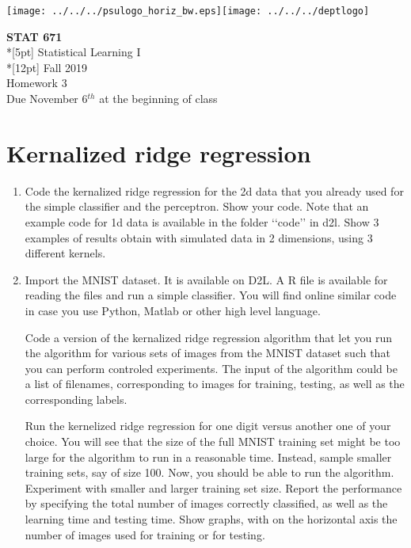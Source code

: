 \documentclass[11pt]{article}
\begin{document}
\thispagestyle{empty}
\texttt{[image: ../../../psulogo\_horiz\_bw.eps]}\hfill\texttt{[image: ../../../deptlogo]}
\vspace{10pt}
\begin{center}
{\large\bf STAT 671}    \\*[5pt] {\Large Statistical Learning I}
\\*[12pt] {\large Fall 2019}
\\ {\large Homework 3}
\\ {\large Due November 6$^{th}$ at the beginning of class}
\end{center}
\vspace{1cm}
\noindent
\section{Kernalized ridge regression}
\begin{enumerate}
\item Code the kernalized ridge regression for the 2d data that you already used for the simple classifier and the perceptron. Show your code. Note that an example code for 1d data is available in the folder \lq\lq{}code\rq\rq{} in d2l.   Show 3 examples of results obtain with simulated data in 2 dimensions, using 3 different kernels. 

\item Import the MNIST dataset. It is available on D2L. A R file is available for reading the files and run a simple classifier.  You will find online similar code in case you use Python,  Matlab or other high level language. 

Code a version of the kernalized ridge regression algorithm that let you run the algorithm for various sets of images from the MNIST dataset such that you can perform controled experiments. The input of the algorithm could be a list of filenames, corresponding to images for training, testing, as well as the corresponding labels.  

Run the kernelized ridge regression for one digit versus another one of your choice. You will see that the size of the full MNIST training set might be too large for the algorithm to run in a reasonable time. Instead, sample smaller training sets, say of size 100. Now, you should be able to run the algorithm. Experiment with smaller and larger training set size. Report the performance by specifying the total number of images correctly classified, as well as the learning time and testing time. Show graphs, with on the horizontal axis the number of images used for training or for testing. 
\end{enumerate}
\end{document}
